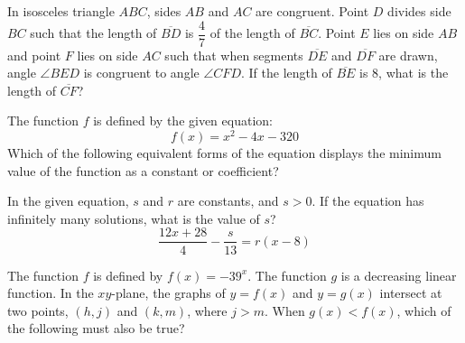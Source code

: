 \vspace{2em}
\newpage

\noindent\markforreview
\vspace{1em}

In isosceles triangle $ABC$, sides $AB$ and $AC$ are congruent. Point $D$ divides side $BC$ such that the length of $\overline{BD}$ is $\dfrac{4}{7}$ of the length of $\overline{BC}$. Point $E$ lies on side $AB$ and point $F$ lies on side $AC$ such that when segments $\overline{DE}$ and $\overline{DF}$ are drawn, angle $\angle BED$ is congruent to angle $\angle CFD$. If the length of $\overline{BE}$ is $8$, what is the length of $\overline{CF}$?

\vspace{0.75em}


\vspace{2em}
\newpage

\noindent\markforreview
\vspace{1em}

The function $f$ is defined by the given equation: 
\[
f(x) = x^2 - 4x - 320
\]
Which of the following equivalent forms of the equation displays the minimum value of the function as a constant or coefficient?

\vspace{0.75em}


\vspace{2em}
\newpage

\noindent\markforreview
\vspace{1em}

In the given equation, $s$ and $r$ are constants, and $s > 0$. If the equation has infinitely many solutions, what is the value of $s$?
\[
\frac{12x + 28}{4} - \frac{s}{13} = r(x - 8)
\]

\vspace{2em}
\newpage

\noindent\markforreview
\vspace{1em}

The function $f$ is defined by $f(x) = -39^x$. The function $g$ is a decreasing linear function.  
In the $xy$-plane, the graphs of $y = f(x)$ and $y = g(x)$ intersect at two points, $(h, j)$ and $(k, m)$, where $j > m$.  
When $g(x) < f(x)$, which of the following must also be true?

